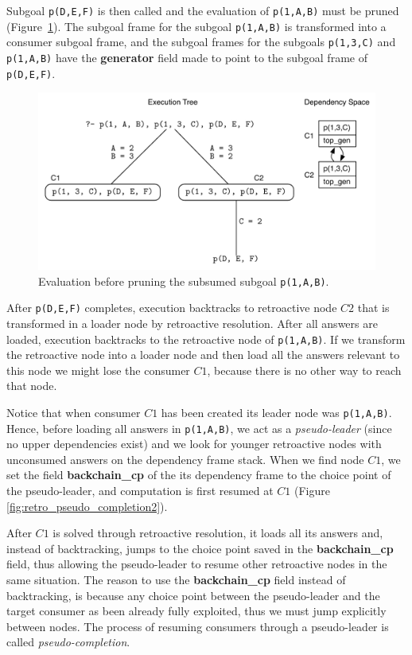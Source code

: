 Subgoal \texttt{p(D,E,F)} is then called and the evaluation of \texttt{p(1,A,B)} must be pruned 
(Figure~\ref{fig:retro_pseudo_completion1}). The subgoal frame for the subgoal \texttt{p(1,A,B)} is
transformed into a consumer subgoal frame, and the subgoal frames for the subgoals \texttt{p(1,3,C)} and
\texttt{p(1,A,B)} have the \textbf{generator} field made to point to the subgoal frame of \texttt{p(D,E,F)}. 

\begin{figure}[ht]
  \centering
    \includegraphics[scale=0.6]{retro_pseudo_completion1.pdf}
  \caption{Evaluation before pruning the subsumed subgoal \texttt{p(1,A,B)}.}
  \label{fig:retro_pseudo_completion1}
\end{figure}

After \texttt{p(D,E,F)} completes, execution backtracks to retroactive node $C2$ that is transformed
in a loader node by retroactive resolution. After all answers are loaded, execution backtracks to
the retroactive node of \texttt{p(1,A,B)}. If we transform the retroactive node into a loader node and
then load all the answers relevant to this node we might lose the consumer $C1$, because there is no
other way to reach that node.

Notice that when consumer $C1$ has been created its leader node was
\texttt{p(1,A,B)}. Hence, before loading all answers in \texttt{p(1,A,B)}, we act as a \textit{pseudo-leader}
(since no upper dependencies exist) and we look for younger retroactive nodes with unconsumed answers on the dependency
frame stack. When we find node $C1$, we set the field \textbf{backchain\_cp} of the its dependency
frame to the choice point of the pseudo-leader, and computation is first resumed at $C1$
(Figure \ref{fig:retro_pseudo_completion2}).

After $C1$ is solved through retroactive resolution, it loads all its answers and, instead of backtracking,
jumps to the choice point saved in the \textbf{backchain\_cp} field, thus allowing the pseudo-leader to resume
other retroactive nodes in the same situation. The reason to use the \textbf{backchain\_cp} field instead of
backtracking, is because any choice point between the pseudo-leader and the target consumer as been already fully
exploited, thus we must jump explicitly between nodes. The process of resuming consumers through a pseudo-leader
is called \textit{pseudo-completion}.


